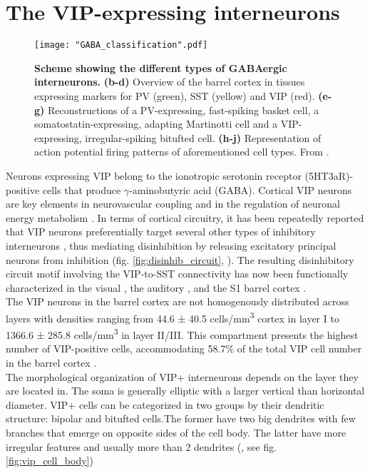 \section{The VIP-expressing interneurons }
\label{sec:vip distribution}
\begin{figure}[!h]
	\captionsetup[figure]{indentation=0pt}
	\texttt{[image: "GABA\_classification".pdf]}
	\caption[Scheme showing the different types of GABAergic interneurons.]{\textbf{Scheme showing the different types of GABAergic interneurons.} \textbf{(b-d)} Overview of the barrel cortex in tissues expressing markers for PV (green), SST (yellow) and VIP (red). \textbf{(e-g)} Reconstructions of a PV-expressing, fast-spiking basket cell, a somatostatin-expressing, adapting Martinotti cell and a VIP-expressing, irregular-spiking bitufted cell. \textbf{(h-j)} Representation of action potential firing patterns of aforementioned cell types. From \cite{Staiger2015}.}	
	\label{fig:gaba_classes}
\end{figure}
 
Neurons expressing VIP belong to the ionotropic serotonin receptor (5HT3aR)-positive cells that produce $ \gamma $-aminobutyric acid (GABA). Cortical VIP neurons are key elements in neurovascular coupling \citep{Cauli2004} and in the regulation of neuronal energy metabolism \citep{Magistretti1999}. In terms of cortical circuitry, it has been repeatedly reported that VIP neurons preferentially target several other types of inhibitory interneurons \citep{Staiger2004,David2007,Pfeffer2013}, thus mediating disinhibition by releasing excitatory principal neurons from inhibition (fig. \ref{fig:disinhib_circuit}, \cite{Wang2018}). The resulting disinhibitory circuit motif involving the VIP-to-SST connectivity has now been functionally characterized in the visual \citep{Fu2014,Zhang2014}, the auditory \citep{Pi2013}, and the S1 barrel cortex \citep{Lee2013, Wang2018}. \\
The VIP neurons in the barrel cortex are not homogenously distributed across layers with densities ranging from 44.6 ± 40.5 cells/mm\textsuperscript{3} cortex in layer I to 1366.6 ± 285.8 cells/mm\textsuperscript{3} in layer II/III. This compartment presents the highest number of VIP-positive cells, accommodating 58.7\% of the total VIP cell number in the barrel cortex \citep{Proenneke2015}. \\ 
The morphological organization of VIP+ interneurons depends on the layer they are located in. The soma is generally elliptic with a larger vertical than horizontal diameter. VIP+ cells can be categorized in two groups by their dendritic structure: bipolar and bitufted cells.The former have two big dendrites with few branches that emerge on opposite sides of the cell body. The latter have more irregular features and usually more than 2 dendrites (\cite{Feldmeyer2013a}, see fig. \ref{fig:vip_cell_body})
